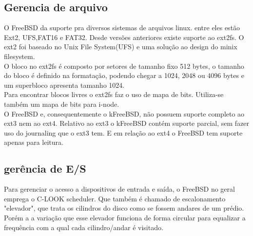 \documentclass[conference]{IEEEtran}
\begin{document}
\subsection{Gerencia de arquivo}\label{sec:BSDArquivo}
O FreeBSD da suporte pra diversos sistemas de arquivos linux. entre eles estão Ext2, UFS,FAT16 e FAT32. Desde versões anteriores existe suporte ao ext2fs. O ext2 foi baseado no Unix File System(UFS) e uma solução ao design do minix filesystem.\\

O bloco no ext2fs é composto por setores de tamanho fixo 512 bytes, o tamanho do bloco é definido na formatação, podendo chegar a 1024, 2048 ou 4096 bytes e um superbloco apresenta tamanho 1024. \\ 
Para encontrar blocos livres o ext2fs faz o uso de mapa de bits. Utiliza-se também um mapa de bits para i-node.\\ 

O FreeBSD e, consequentemente o kFreeBSD, não possuem suporte completo ao ext3 nem ao ext4. Relativo ao ext3 o kFreeBSD contém suporte parcial, sem fazer uso do journaling que o ext3 tem. E em relação ao ext4 o FreeBSD tem suporte apenas para leitura.\cite{kFreeBSD-ext4}\\
\subsection{gerência de E/S}\label{sec:BSDES}
Para gerenciar o acesso a dispositivos de entrada e saída, o FreeBSD no geral emprega o C-LOOK scheduler\cite{FreeBSD-Hybrid}. Que também é chamado de escalonamento "elevador", que trata os cilindros do disco como se fossem andares de um prédio. Porém a a variação que esse elevador funciona de forma circular para equalizar a frequência com a qual cada cilindro/andar é visitado.\\
\end{document}
